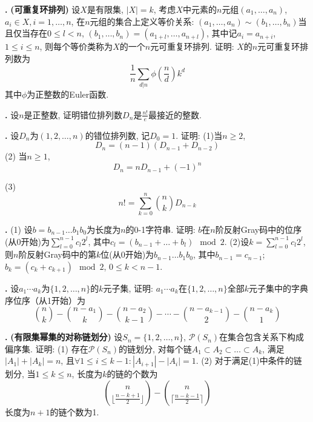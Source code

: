 \par \textbf{\theprobenum .} \textbf{(可重复环排列)} 设$X$是有限集, $|X|=k$, 考虑$X$中元素的$n$元组$(a_1,\dots,a_n)$, $a_i\in X, i=1,\dots,n$, 在$n$元组的集合上定义等价关系: $(a_1,\dots,a_n)\sim (b_1,\dots,b_n)$当且仅当存在$0\le l < n$, $(b_1,\dots, b_n)=(a_{1+l}, \dots, a_{n+l})$, 其中记$a_i=a_{n+i}$, $1\le i\le n$, 则每个等价类称为$X$的一个$n$元可重复环排列. 证明: $X$的$n$元可重复环排列数为
\begin{equation}
    \frac{1}{n}\sum_{d|n} \phi\left(\frac{n}{d}\right) k^d
\end{equation}
其中$\phi$为正整数的Euler函数. 

\par \textbf{\theprobenum .} \cite{IC} 设$n$是正整数, 证明错位排列数$D_n$是$\frac{n!}{e}$最接近的整数. 

\par \textbf{\theprobenum .} \cite{IC} 设$D_n$为$(1,2,\dots,n)$的错位排列数, 记$D_0=1$. 证明: (1)当$n\ge 2$, 
\begin{equation}
    D_n=(n-1)(D_{n-1}+D_{n-2})
\end{equation}
(2) 当$n\ge 1$, 
\begin{equation}
    D_n=n D_{n-1} +(-1)^n
\end{equation}
\par (3) \begin{equation}
    n! = \sum_{k=0}^n \binom{n}{k} D_{n-k}
\end{equation}

\par \textbf{\theprobenum .} \cite{IC} (1) 设$b=b_{n-1}\dots b_1b_0$为长度为$n$的0-1字符串. 证明: $b$在$n$阶反射Gray码中的位序(从0开始)为$\sum_{l=0}^{n-1} c_l 2^l$, 其中$c_l = (b_{n-1}+\dots +b_l) \mod 2$. (2)设$k = \sum_{l=0}^{n-1} c_l 2^l$, 则$n$阶反射Gray码中的第$k$位(从0开始)为$b_{n-1}\dots b_1b_0$, 其中$b_{n-1}=c_{n-1}$; $b_k = (c_k+c_{k+1}) \mod 2$, $0\le k<n-1$. 

\par \textbf{\theprobenum .} \cite{IC} 设$a_1\cdots a_k$为$\{1,2,\dots,n\}$的$k$元子集, 证明: $a_1\cdots a_k$在$\{1,2,\dots,n\}$全部$k$元子集中的字典序位序（从1开始）为
\begin{equation}
    \binom{n}{k} - \binom{n-a_1}{k} - \binom{n-a_2}{k-1} - \cdots - \binom{n-a_{k-1}}{2} - \binom{n-a_k}{1}
\end{equation}

\par \textbf{\theprobenum .} \textbf{(有限集幂集的对称链划分)} 设$S_n=\{1,2,\dots,n\}$, $\mathcal{P}(S_n)$在集合包含关系下构成偏序集. 证明: (1) 存在$\mathcal{P}(S_n)$的链划分, 对每个链$A_1\subset A_2 \subset \dots \subset A_k$, 满足$|A_1|+|A_k|=n$, 且$\forall 1\le i\le k-1: |A_{i+1}|-|A_{i}|=1$. (2) 对于满足(1)中条件的链划分, 当$1\le k\le n$, 长度为$k$的链的个数为
\begin{displaymath}
    \binom{n}{\lfloor \frac{n-k+1}{2}\rfloor} - \binom{n}{\lceil \frac{n-k-1}{2}\rceil}
\end{displaymath}
长度为$n+1$的链个数为1. 

